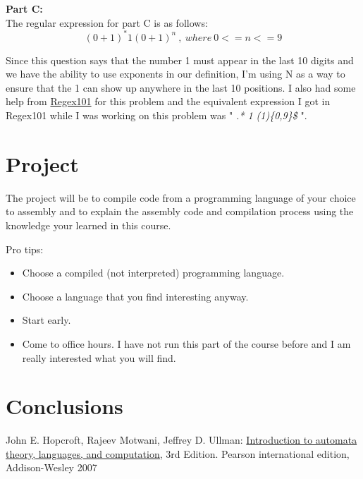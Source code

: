 \documentclass{article}
\theoremstyle{theorem}
\theoremstyle{definition}
\theoremstyle{remark}
\begin{document}
\textbf{Part C:}\\
The regular expression for part C is as follows:
\begin{equation}
    (0+1)^* 1 (0+1)^n\ ,\ where\ 0 <= n <= 9
\end{equation}

Since this question says that the number 1 must appear in the last 10 digits and we have the ability to use exponents in our definition, I'm using N as a way to ensure that the 1 can show up anywhere in the last 10 positions. I also had some help from \href{https://regex101.com/}{Regex101} for this problem and the equivalent expression I got in Regex101 while I was working on this problem was " \textit{.* 1 (1)\{0,9\}\$} ".


\section{Project}

The project will be to compile code from a programming language of your choice to assembly and to explain the assembly code and compilation process using the knowledge your learned in this course. 


\medskip\noindent
Pro tips:
\begin{itemize}
\item Choose a compiled (not interpreted) programming language.
\item Choose a language that you find interesting anyway.
\item Start early.
\item Come to office hours. I have not run this part of the course before and I am really interested what you will find.
\end{itemize}
 
\section{Conclusions}\label{conclusions}



\begin{thebibliography}{99}
	John E. Hopcroft, Rajeev Motwani, Jeffrey D. Ullman:
\href{http://ce.sharif.edu/courses/94-95/1/ce414-2/resources/root/Text%20Books/Automata/John%20E.%20Hopcroft,%20Rajeev%20Motwani,%20Jeffrey%20D.%20Ullman-Introduction%20to%20Automata%20Theory,%20Languages,%20and%20Computations-Prentice%20Hall%20(2006).pdf}{Introduction to automata theory, languages, and computation,} 3rd Edition. Pearson international edition, Addison-Wesley 2007

\end{thebibliography}
\end{document}

